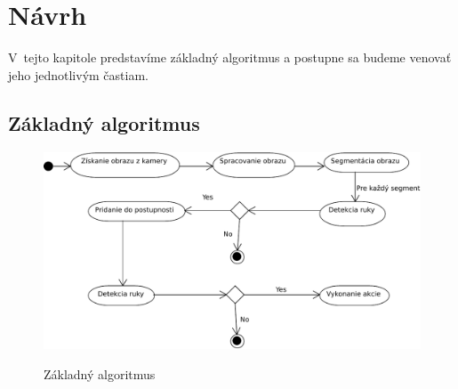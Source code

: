 
\chapter{Návrh}\label{chap:design}

V~tejto kapitole predstavíme základný algoritmus a postupne sa budeme venovať jeho jednotlivým častiam.
\bigskip

\section{Základný algoritmus}

\begin{figure}[htp]
    \centering
    \includegraphics[width=\textwidth]{images/BaseAlgorithm}
    \label{fig:base_alg}
    \caption{Základný algoritmus}
\end{figure}



